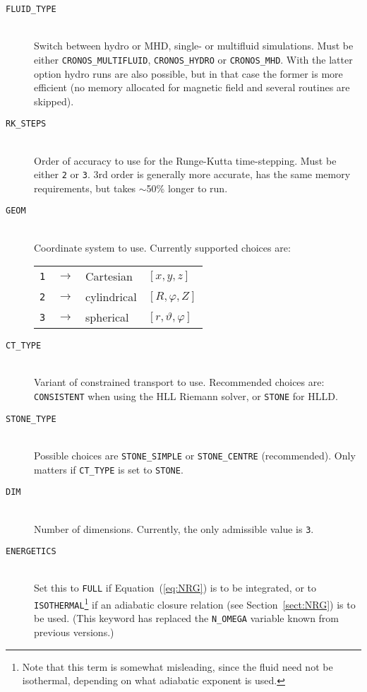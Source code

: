 \begin{description}
  
\item[{\tt FLUID\_TYPE}]{\ }\\ Switch between hydro or MHD, single- or multifluid
  simulations. Must be either \verb+CRONOS_MULTIFLUID+, \verb+CRONOS_HYDRO+ or
  \verb+CRONOS_MHD+. With the latter option hydro runs are also
  possible, but in that case the former is more efficient (no memory
  allocated for magnetic field and several routines are skipped).

\item[{\tt  RK\_STEPS}]{\ }\\
  Order of accuracy to use for the Runge-Kutta time-stepping. Must be
  either {\tt 2} or {\tt 3}. 3rd order is generally more accurate,
  has the same memory requirements, but takes $\sim$50\% longer to
  run.
  
\item[{\tt GEOM}]{\ }\\
  Coordinate system to use. Currently supported choices are:\\
  \begin{tabular}{ccll}
    {\tt 1} &$\rightarrow$& Cartesian   &$[x, y,         z]$ \\
    {\tt 2} &$\rightarrow$& cylindrical &$[R, \varphi,   Z]$ \\
    {\tt 3} &$\rightarrow$& spherical   &$[r, \vartheta, \varphi]$
  \end{tabular}
  
\item[{\tt CT\_TYPE}]{\ }\\
  Variant of constrained transport to use. Recommended choices are: 
  {\tt CONSISTENT} when using the HLL Riemann solver, or
  {\tt STONE} for HLLD.
  
\item[{\tt STONE\_TYPE}]{\ }\\
  Possible choices are {\tt STONE\_SIMPLE} or {\tt STONE\_CENTRE}
  (recommended). Only matters if {\tt CT\_TYPE} is set to
  {\tt STONE}.
  
\item[{\tt DIM}]{\ }\\
  Number of dimensions. Currently, the only admissible value is
  {\tt 3}.
  
\item[{\tt ENERGETICS}]{\ }\\
  Set this to {\tt FULL} if Equation~(\ref{eq:NRG}) is to be integrated,
  or to {\tt ISOTHERMAL}\footnote{Note that this term is somewhat
    misleading, since the fluid need not be isothermal, depending on
    what adiabatic exponent is used.} if an adiabatic closure relation
  (see Section~\ref{sect:NRG}) is to be used. (This keyword has replaced
  the {\tt N\_OMEGA} variable known from previous versions.)
  

\end{description}
